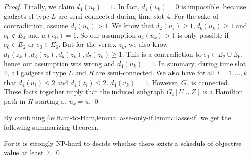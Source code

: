 \begin{proof}
Finally, we claim $d_4(u_k) = 1$. In fact, $d_4(u_k) = 0$ is impossible, because gadgets of type $L$ are semi-connected during time slot 4. For the sake of contradiction, assume $d_4(u_k) > 1$. We know that $d_2(u_k) \geq 1, d_6(u_k) \geq 1$ and $e_0 \not\in E_4$ and $w(e_0) = 1$. So our assumption $d_4(u_k) > 1$ is only possible if $e_0 \in E_2$ or $e_0 \in E_6$. But for the vertex $z_k$, we also know $d_1(z_k), d_3(z_k), d_5(z_k), d_7(z_k) \geq 1$. This is a contradiction to $e_0 \in E_2 \cup E_6$, hence our assumption was wrong and $d_4(u_k) = 1$.
In summary, during time slot 4, all gadgets of type $L$ and $R$ are semi-connected. We also have for all $i=1,\dots,k$ that $d_4(u_i) \leq 2$ and $d_4(z_i) \leq 2$.  $d_4(u_k) = 1$. However, $G_4$ is connected. These facts together imply that the induced subgraph $G_4[U \cup Z]$ is a Hamilton path in $H$ starting at $u_k = u$.
\qed
\end{proof}

By combining \cref{le:Ham-to-Ham,lemma:lasse-only-if,lemma:lasse-if} we get
the following summarizing theorem.
\begin{theorem}
\label{th:value=7}
For {\xxxNTP} it is strongly NP-hard to decide whether there exists a schedule
of objective value at least~$7$.
\qed
\end{theorem}

